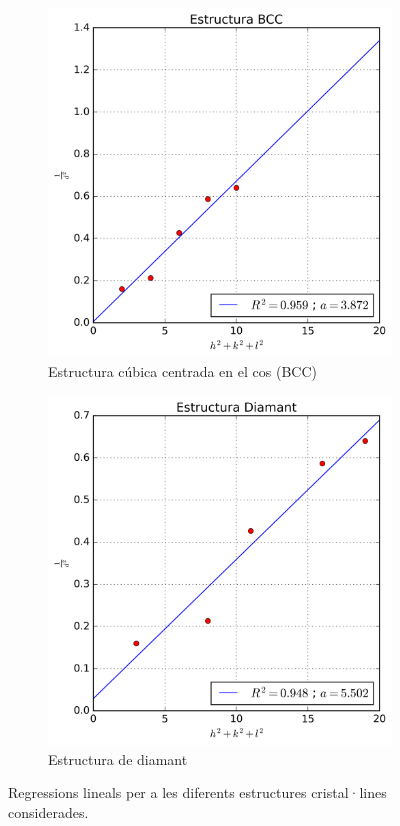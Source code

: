 \documentclass[a4paper, 11pt]{article}
\begin{document}
\begin{figure}[htbp]
  \vspace{0.5em}


  \begin{subfigure}[b]{0.48\textwidth}
    \centering
    \includegraphics[width=\linewidth]{images/BCC.png}
    \caption{Estructura cúbica centrada en el cos (BCC)}
    \label{fig:3}
  \end{subfigure}
  \hfill
  \begin{subfigure}[b]{0.48\textwidth}
    \centering
    \includegraphics[width=\linewidth]{images/Diamant.png}
    \caption{Estructura de diamant}
    \label{fig:4}
  \end{subfigure}

  \caption{Regressions lineals per a les diferents estructures cristal·lines considerades.}
  \label{fig:grafics}
\end{figure}
\end{document}
